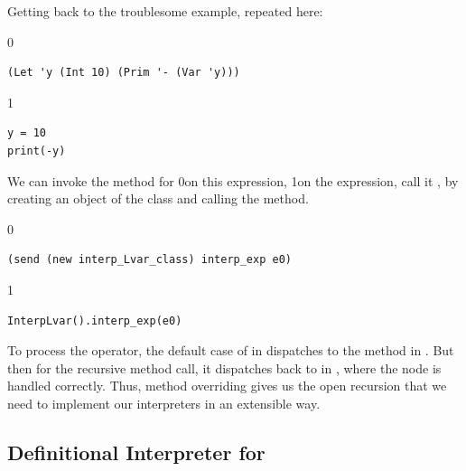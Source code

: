 \documentclass[7x10]{TimesAPriori_MIT}%
\def\racketEd{0}
\def\pythonEd{1}
\def\edition{1}
\newcommand{\racket}[1]{{\if\edition\racketEd{#1}\fi}}
\newcommand{\python}[1]{{\if\edition\pythonEd #1\fi}}
\begin{document}
Getting back to the troublesome example, repeated here:
{\if\edition\racketEd  
\begin{lstlisting}
(Let 'y (Int 10) (Prim '- (Var 'y)))
\end{lstlisting}
\fi}
{\if\edition\pythonEd
\begin{lstlisting}
y = 10
print(-y)
\end{lstlisting}
\fi}
\noindent We can invoke the  method for \LangVar{}
\racket{on this expression,}
\python{on the  expression,}
%
call it , by creating an object of the \LangVar{} class
and calling the  method.
{\if\edition\racketEd
\begin{lstlisting}
(send (new interp_Lvar_class) interp_exp e0)
\end{lstlisting}
\fi}
{\if\edition\pythonEd
\begin{lstlisting}
InterpLvar().interp_exp(e0)
\end{lstlisting}
\fi}
\noindent To process the \code{-} operator, the default case of
 in \LangVar{} dispatches to the 
method in \LangInt{}. But then for the recursive method call, it
dispatches back to  in \LangVar{}, where the
 node is handled correctly. Thus, method overriding gives us
the open recursion that we need to implement our interpreters in an
extensible way.


\subsection{Definitional Interpreter for \LangVar{}}
\label{sec:interp-Lvar}
\end{document}
